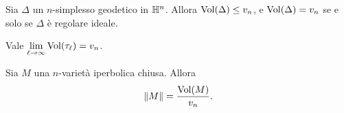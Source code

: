 \begin{theorem}
Sia $\Delta$ un $n$-simplesso geodetico in $\mathbb{H}^n$. Allora $\operatorname{Vol}(\Delta)\le v_n$, e $\operatorname{Vol}(\Delta)=v_n$ se e solo se $\Delta$ è regolare ideale.
\end{theorem}

\begin{theorem}
Vale $\lim\limits_{\ell\to\infty}\operatorname{Vol}(\tau_\ell)=v_n$.
\end{theorem}


\begin{proposition}
Sia $M$ una $n$-varietà iperbolica chiusa. Allora
\[
\left\lVert M\right\rVert=\frac{\operatorname{Vol}(M)}{v_n}.
\]
\end{proposition}
